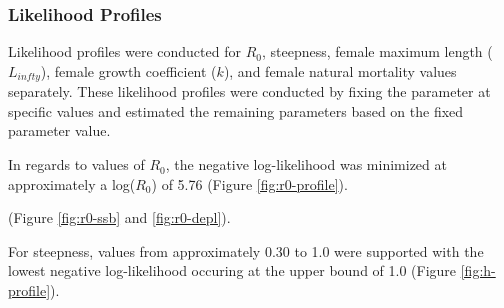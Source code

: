 \documentclass[11pt,
  english,
  a4paper,
]{article}
\begin{document}
\leavevmode\tagmcend\tagstructend\par


\hypertarget{likelihood-profiles}{%
\subsubsection{Likelihood Profiles}\label{likelihood-profiles}}

\leavevmode\tagmcend\tagstructend


Likelihood profiles were conducted for {\(R_0\)\leavevmode\tagmcend\tagstructend}, steepness, female maximum length ({\(L_{infty}\)\leavevmode\tagmcend\tagstructend}), female growth coefficient ({\(k\)\leavevmode\tagmcend\tagstructend}), and female natural mortality values separately. These likelihood profiles were conducted by fixing the parameter at specific values and estimated the remaining parameters based on the fixed parameter value.

\leavevmode\tagmcend\tagstructend\par


In regards to values of {\(R_0\)\leavevmode\tagmcend\tagstructend}, the negative log-likelihood was minimized at approximately a log({\(R_0\)\leavevmode\tagmcend\tagstructend}) of 5.76 (Figure \ref{fig:r0-profile}).

\leavevmode\tagmcend\tagstructend\par


(Figure \ref{fig:r0-ssb} and \ref{fig:r0-depl}).

\leavevmode\tagmcend\tagstructend\par


For steepness, values from approximately 0.30 to 1.0 were supported with the lowest negative log-likelihood occuring at the upper bound of 1.0 (Figure \ref{fig:h-profile}).

\leavevmode\tagmcend\tagstructend\par
\end{document}
